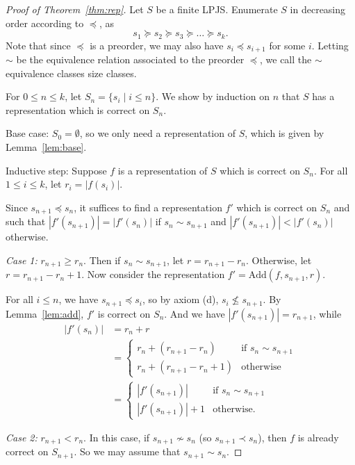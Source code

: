 \documentclass[12pt]{article}
\newcommand{\Add}{\text{Add}}
\begin{document}
\begin{proof}[Proof of Theorem~\ref{thm:rep}]
Let $S$ be a finite LPJS. Enumerate $S$ in decreasing order according to $\preceq$, as $$s_1\succeq s_2 \succeq s_3 \succeq \dots \succeq s_k.$$
Note that since $\preceq$ is a preorder, we may also have $s_i \preceq s_{i+1}$ for some $i$. Letting $\sim$ be the equivalence relation associated to the preorder $\preceq$, we call the $\sim$ equivalence classes size classes.

For $0\leq n \leq k$, let $S_n = \{s_i\mid i \leq n\}$. We show by induction on $n$ that $S$ has a representation which is correct on $S_n$.

Base case: $S_0 = \emptyset$, so we only need a representation of $S$, which is given by Lemma~\ref{lem:base}. 

Inductive step: Suppose $f$ is a representation of $S$ which is correct on $S_n$. For all $1\leq i \leq k$, let $r_i = |f(s_i)|$. 

Since $s_{n+1}\preceq s_n$, it suffices to find a representation $f'$ which is correct on $S_n$ and such that $|f'(s_{n+1})| = |f'(s_n)|$ if $s_n \sim s_{n+1}$ and $|f'(s_{n+1})| < |f'(s_n)|$ otherwise.

\emph{Case 1:} $r_{n+1} \geq r_n$. Then if $s_n\sim s_{n+1}$, let $r = r_{n+1} - r_n$. Otherwise, let $r = r_{n+1}-r_n+1$. Now consider the representation $f' = \Add(f,s_{n+1},r)$. 

For all $i\leq n$, we have $s_{n+1}\preceq s_i$, so by axiom (d), $s_i\not\leq s_{n+1}$. By Lemma~\ref{lem:add}, $f'$ is correct on $S_n$. And we have $|f'(s_{n+1})| = r_{n+1}$, while \begin{align*}
    |f'(s_n)| &= r_n + r\\ &= \begin{cases} r_n + (r_{n+1}-r_n) & \text{if }s_n\sim s_{n+1}\\
r_n + (r_{n+1}-r_n+1) & \text{otherwise}\end{cases}\\
&= \begin{cases} |f'(s_{n+1})| & \text{if }s_n\sim s_{n+1}\\
|f'(s_{n+1})|+1 & \text{otherwise}.
\end{cases}
\end{align*}

\emph{Case 2:} $r_{n+1} < r_n$. In this case, if $s_{n+1}\not\sim s_n$ (so $s_{n+1} \prec s_n$), then $f$ is already correct on $S_{n+1}$. So we may assume that $s_{n+1}\sim s_n$. 


\end{proof}
\end{document}
